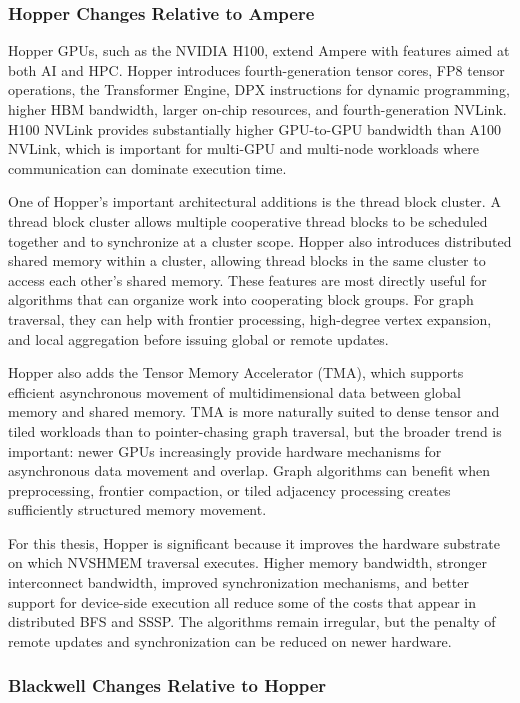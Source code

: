 \documentclass{article}
\begin{document}
\subsubsection*{Hopper Changes Relative to Ampere}

Hopper GPUs, such as the NVIDIA H100, extend Ampere with features aimed at both AI and HPC. Hopper introduces fourth-generation tensor cores, FP8 tensor operations, the Transformer Engine, DPX instructions for dynamic programming, higher HBM bandwidth, larger on-chip resources, and fourth-generation NVLink. H100 NVLink provides substantially higher GPU-to-GPU bandwidth than A100 NVLink, which is important for multi-GPU and multi-node workloads where communication can dominate execution time.

One of Hopper's important architectural additions is the thread block cluster. A thread block cluster allows multiple cooperative thread blocks to be scheduled together and to synchronize at a cluster scope. Hopper also introduces distributed shared memory within a cluster, allowing thread blocks in the same cluster to access each other's shared memory. These features are most directly useful for algorithms that can organize work into cooperating block groups. For graph traversal, they can help with frontier processing, high-degree vertex expansion, and local aggregation before issuing global or remote updates.

Hopper also adds the Tensor Memory Accelerator (TMA), which supports efficient asynchronous movement of multidimensional data between global memory and shared memory. TMA is more naturally suited to dense tensor and tiled workloads than to pointer-chasing graph traversal, but the broader trend is important: newer GPUs increasingly provide hardware mechanisms for asynchronous data movement and overlap. Graph algorithms can benefit when preprocessing, frontier compaction, or tiled adjacency processing creates sufficiently structured memory movement.

For this thesis, Hopper is significant because it improves the hardware substrate on which NVSHMEM traversal executes. Higher memory bandwidth, stronger interconnect bandwidth, improved synchronization mechanisms, and better support for device-side execution all reduce some of the costs that appear in distributed BFS and SSSP. The algorithms remain irregular, but the penalty of remote updates and synchronization can be reduced on newer hardware.

\subsubsection*{Blackwell Changes Relative to Hopper}
\end{document}
